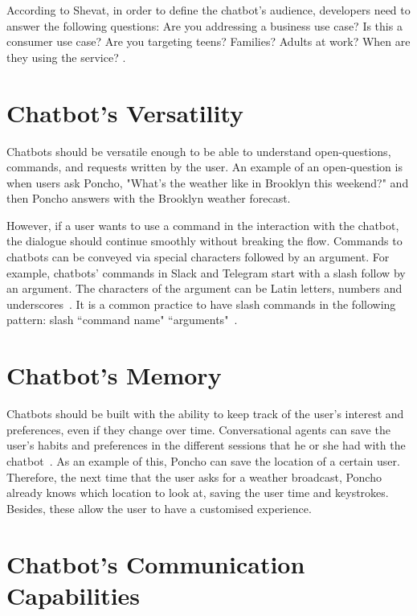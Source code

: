 \documentclass[a4paper,10pt]{article}
\begin{document}
According to Shevat, in order to define the chatbot's audience, developers need to answer the following questions: Are you addressing a business use case? Is this a consumer use case? Are you targeting teens? Families? Adults at work? When are they using the service? \cite{Shevat2017}.

\section{Chatbot's Versatility}
Chatbots should be versatile enough to be able to understand open-questions, commands, and requests written by the user. An example of an open-question is when users ask Poncho, "What's the weather like in Brooklyn this weekend?" and then Poncho answers with the Brooklyn weather forecast. 

However, if a user wants to use a command in the interaction with the chatbot, the dialogue should continue smoothly without breaking the flow. Commands to chatbots can be conveyed via special characters followed by an argument. For example, chatbots' commands in Slack and Telegram start with a slash follow by an argument. The characters of the argument can be Latin letters, numbers and underscores~\cite{botfather}. It is a common practice to have slash commands in the following pattern: slash ``command name" ``arguments"~\cite{Shevat2017}.  

\section{Chatbot's Memory}

Chatbots should be built with the ability to keep track of the user's interest and preferences, even if they change over time. Conversational agents can save the user's habits and preferences in the different sessions that he or she had with the chatbot~\cite{shneiderman1997direct}. As an example of this, Poncho can save the location of a certain user. Therefore, the next time that the user asks for a weather broadcast, Poncho already knows which location to look at, saving the user time and keystrokes. Besides, these allow the user to have a customised experience. 


\section{Chatbot's Communication Capabilities}
\end{document}
